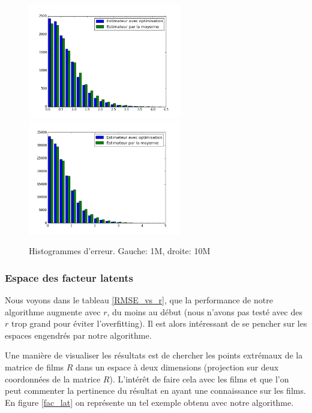 \documentclass[10pt,a4paper]{article}
\begin{document}
\begin{figure}[h]
\begin{center}
\includegraphics[height=5cm]{fig/histo}
\includegraphics[height=5cm]{fig/histo10m}
\caption{\label{histo_best} Histogrammes d'erreur. Gauche: 1M, droite: 10M}
\end{center}
\end{figure}


\subsubsection*{Espace des facteur latents}

Nous voyons dans le tableau \ref{RMSE_vs_r}, que la performance de notre algorithme augmente avec $r$, du moins au début (nous n'avons pas testé avec des $r$ trop grand pour éviter l'overfitting). Il est alors intéressant de se pencher sur les espaces engendrés par notre algorithme. 

Une manière de visualiser les résultats est de chercher les points extrémaux de la matrice de films $R$ dans un espace à deux dimensions (projection sur deux coordonnées de la matrice $R$). L'intérêt de faire cela avec les films et que l'on peut commenter la pertinence du résultat en ayant une connaissance sur les films. En figure \ref{fac_lat} on représente un tel exemple obtenu avec notre algorithme.

\end{document}
